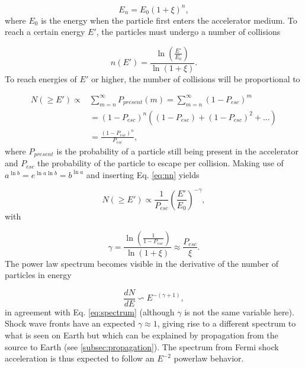 \begin{equation}
E_n = E_0 \left(1+\xi\right)^n,
\end{equation}
where $E_0$ is the energy when the particle first enters the accelerator medium. To reach a certain energy $E'$, the particles must undergo a number of collisions

\begin{equation}
\label{eq:nn}
n(E') = \frac{\ln \left(\frac{E'}{E_0}\right)}{\ln \left(1+\xi \right)}.
\end{equation}
To reach energies of $E'$ or higher, the number of collisions will be proportional to

\begin{equation}
\begin{split}
N(\geq E') \varpropto &\sum^\infty_{m=n} P_{present}(m) = \sum^\infty_{m=n} \left(1-P_{esc} \right)^m\\
&= (1-P_{esc})^n \left((1 - P_{esc}) + (1 - P_{esc})^2 + ...\right) \\
&= \frac{(1-P_{esc})^n}{P_{esc}},
\end{split}
\end{equation}
where $P_{present}$ is the probability of a particle still being present in the accelerator and $P_{esc}$ the probability of the particle to escape per collision. Making use of $a^{\ln b} = e^{\ln a \ln b} = b^{\ln a}$ and inserting Eq. \ref{eq:nn} yields

\begin{equation}
N(\geq E') \varpropto \frac{1}{P_{esc}} \left(\frac{E'}{E_0}\right)^{-\gamma},
\end{equation}
with

\begin{equation}
\gamma = \frac{\ln \left(\frac{1}{1-P_{esc}}\right)}{\ln \left(1 + \xi \right)} \approx \frac{P_{esc}}{\xi}.
\end{equation}
The power law spectrum becomes visible in the derivative of the number of particles in energy

\begin{equation}
\frac{dN}{dE} \backsim E^{-(\gamma + 1)},
\end{equation}
in agreement with Eq. \ref{eq:spectrum} (although $\gamma$ is not the same variable here). Shock wave fronts have an expected $\gamma \approx 1$, giving rise to a different spectrum to what is seen on Earth but which can be explained by propagation from the source to Earth (see \ref{subsec:propagation}). The spectrum from Fermi shock acceleration is thus expected to follow an $E^{-2}$ powerlaw behavior.

